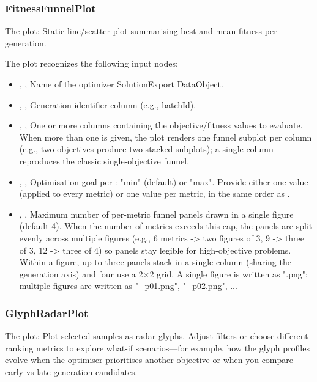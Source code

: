 \subsubsection{FitnessFunnelPlot}
The   plot: Static line/scatter plot summarising best and mean fitness per generation.

The  plot recognizes the following input nodes:
\begin{itemize}
  \item {}, , Name of the optimizer SolutionExport DataObject.
  \item {}, , Generation identifier column (e.g., batchId).
  \item {}, , One or more columns containing the objective/fitness values to evaluate. When more than one is given, the plot renders one funnel subplot per column (e.g., two objectives produce two stacked subplots); a single column reproduces the classic single-objective funnel.
  \item {}, , Optimisation goal per : "min" (default) or "max". Provide either one value (applied to every metric) or one value per metric, in the same order as .
  \item {}, , Maximum number of per-metric funnel panels drawn in a single figure (default 4). When the number of metrics exceeds this cap, the panels are split evenly across multiple figures (e.g., 6 metrics -\textgreater{} two figures of 3, 9 -\textgreater{} three of 3, 12 -\textgreater{} three of 4) so panels stay legible for high-objective problems. Within a figure, up to three panels stack in a single column (sharing the generation axis) and four use a 2\(\times\)2 grid. A single figure is written as ".png"; multiple figures are written as "\_p01.png", "\_p02.png", ...
\end{itemize}

\subsubsection{GlyphRadarPlot}
The   plot: Plot selected samples as radar glyphs. Adjust  filters or choose different ranking metrics to explore what-if scenarios---for example, how the glyph profiles evolve when the optimiser prioritises another objective or when you compare early vs late-generation candidates.

